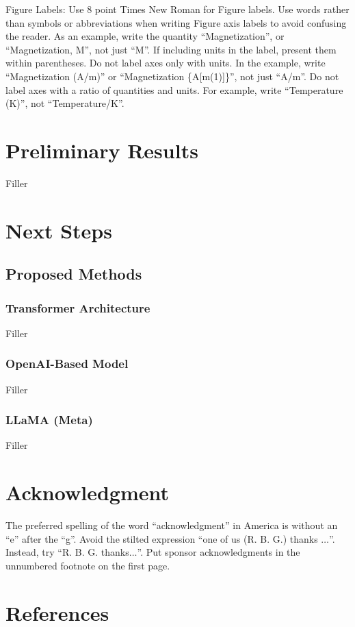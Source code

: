 \documentclass[conference]{IEEEtran}
\begin{document}
Figure Labels: Use 8 point Times New Roman for Figure labels. Use words 
rather than symbols or abbreviations when writing Figure axis labels to 
avoid confusing the reader. As an example, write the quantity 
``Magnetization'', or ``Magnetization, M'', not just ``M''. If including 
units in the label, present them within parentheses. Do not label axes only 
with units. In the example, write ``Magnetization (A/m)'' or ``Magnetization 
\{A[m(1)]\}'', not just ``A/m''. Do not label axes with a ratio of 
quantities and units. For example, write ``Temperature (K)'', not 
``Temperature/K''.

\section{Preliminary Results}
Filler

\section{Next Steps}

\subsection{Proposed Methods}
	\subsubsection{Transformer Architecture} Filler
	\subsubsection{OpenAI-Based Model} Filler
	\subsubsection{LLaMA (Meta)} Filler
	
\section*{Acknowledgment}

The preferred spelling of the word ``acknowledgment'' in America is without 
an ``e'' after the ``g''. Avoid the stilted expression ``one of us (R. B. 
G.) thanks $\ldots$''. Instead, try ``R. B. G. thanks$\ldots$''. Put sponsor 
acknowledgments in the unnumbered footnote on the first page.

\section*{References}
\end{document}
